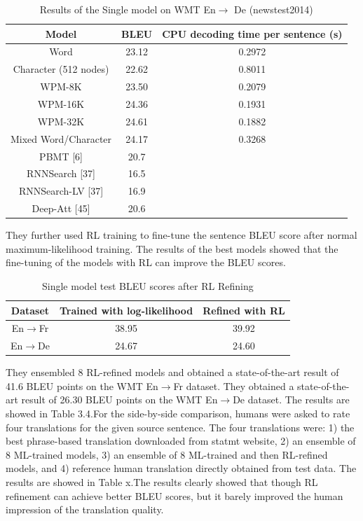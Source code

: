\begin{table}[h!]
\centering
 \begin{tabular}{ |ccc| } 
  \hline Model & BLEU &  CPU decoding time
per sentence (s) \\ 
  \hline  Word &  23.12 & 0.2972\\
  Character (512 nodes)& 22.62 & 0.8011\\
  WPM-8K & 23.50 &  0.2079\\
  WPM-16K & 24.36 & 0.1931\\
  WPM-32K & 24.61 & 0.1882\\
  Mixed Word/Character & 24.17 & 0.3268\\
  \hline PBMT [6] & 20.7 &\\
  RNNSearch [37]  &  16.5 & \\
  RNNSearch-LV [37] &16.9&\\
  Deep-Att [45] & 20.6&\\
  \hline
 \end{tabular}
\caption{Results of the Single model on WMT En$\rightarrow$ De (newstest2014)}
\end{table}


They further used RL training to fine-tune the sentence BLEU score after normal maximum-likelihood training. The results of the best models showed that the fine-tuning of the models with RL can improve the BLEU scores. 


\begin{table}[h!]
\centering
 \begin{tabular}{ |ccc| } 
  \hline Dataset & Trained with log-likelihood &  Refined with RL \\ 
  \hline  En$\rightarrow$Fr &   38.95 & 39.92\\
  En$\rightarrow$De &  24.67 &  24.60\\
  \hline
 \end{tabular}
\caption{Single model test BLEU scores after RL Refining}
\end{table}

They ensembled 8 RL-refined models and obtained a state-of-the-art result of 41.6 BLEU points on the WMT En$\rightarrow$Fr dataset. They obtained a state-of-the-art result of 26.30 BLEU points on the WMT En$\rightarrow$De dataset. The results are showed in Table 3.4.For the side-by-side comparison, humans were asked to rate four translations for the given source sentence. The four translations were: 1) the best phrase-based translation downloaded from statmt website, 2) an ensemble of 8 ML-trained models, 3) an ensemble of 8 ML-trained and then RL-refined models, and 4) reference human translation directly obtained from test data. The results are showed in Table x.The results clearly showed that though RL refinement can achieve better BLEU scores, but it barely improved the human impression of the translation quality. 

